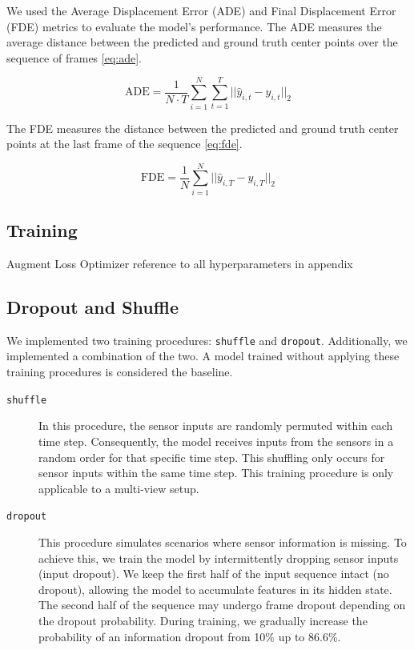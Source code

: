 We used the Average Displacement Error (ADE) and Final Displacement Error (FDE) metrics to evaluate the model's performance. The ADE measures the average distance between the predicted and ground truth center points over the sequence of frames \ref{eq:ade}.

\begin{equation}
    \text{ADE} = \frac{1}{N \cdot T} \sum_{i=1}^{N} \sum_{t=1}^{T} || \hat{y}_{i,t} - y_{i,t} ||_2
    \label{eq:ade}
\end{equation}

The FDE measures the distance between the predicted and ground truth center points at the last frame of the sequence \ref{eq:fde}.

\begin{equation}
    \text{FDE} = \frac{1}{N} \sum_{i=1}^{N} || \hat{y}_{i,T} - y_{i,T} ||_2
    \label{eq:fde}
\end{equation}

\subsection{Training} \label{Methods:Training}

Augment
Loss
Optimizer
reference to all hyperparameters in appendix


\subsection{Dropout and Shuffle} \label{Methods:Training:DropoutAndShuffle}

We implemented two training procedures: \texttt{shuffle} and \texttt{dropout}. Additionally, we implemented a combination of the two. A model trained without applying these training procedures is considered the baseline.

\begin{description}
    \item[\texttt{shuffle}] In this procedure, the sensor inputs are randomly permuted within each time step. Consequently, the model receives inputs from the sensors in a random order for that specific time step. This shuffling only occurs for sensor inputs within the same time step. This training procedure is only applicable to a multi-view setup.

    \item[\texttt{dropout}] This procedure simulates scenarios where sensor information is missing. To achieve this, we train the model by intermittently dropping sensor inputs (input dropout). We keep the first half of the input sequence intact (no dropout), allowing the model to accumulate features in its hidden state. The second half of the sequence may undergo frame dropout depending on the dropout probability. During training, we gradually increase the probability of an information dropout from 10\% up to 86.6\%.
\end{description}





